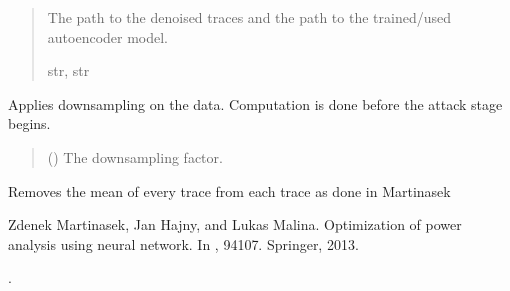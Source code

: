 \documentclass[letterpaper,10pt,english]{sphinxmanual}
\begin{document}
\begin{fulllineitems}
\begin{fulllineitems}
\begin{quote}
\begin{description}
\begin{itemize}
\end{itemize}

\sphinxAtStartPar
The path to the denoised traces and the path to the trained/used autoencoder model.

\sphinxAtStartPar
str, str

\end{description}\end{quote}

\end{fulllineitems}


\begin{fulllineitems}
\label{\detokenize{MLSCAlib.Data:MLSCAlib.Data.custom_manager.CustomDataManager.apply_decimation}}
\pysigstartsignatures
{}
\pysigstopsignatures
\sphinxAtStartPar
Applies downsampling on the data. Computation is done before the attack stage begins.
\begin{quote}\begin{description}
\sphinxAtStartPar
{} (\sphinxstyleliteralemphasis{\sphinxupquote{, }}) \textendash{} The downsampling factor.

\end{description}\end{quote}

\end{fulllineitems}


\begin{fulllineitems}
\label{\detokenize{MLSCAlib.Data:MLSCAlib.Data.custom_manager.CustomDataManager.apply_mean_removal}}
\pysigstartsignatures
{}
\pysigstopsignatures
\sphinxAtStartPar
Removes the mean of every trace from each trace as done in Martinasek %
\begin{footnote}[4]\sphinxAtStartFootnote
Zdenek Martinasek, Jan Hajny, and Lukas Malina. Optimization of power analysis using neural network. In , 94\textendash{}107. Springer, 2013.
%
\end{footnote}.


\end{fulllineitems}
\end{fulllineitems}
\end{document}
